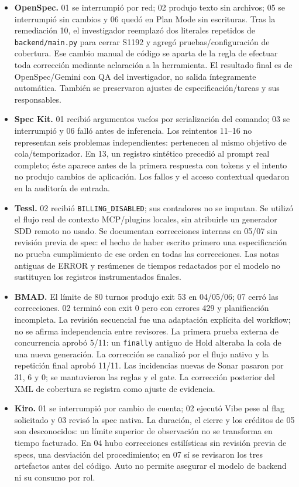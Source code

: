 \begin{itemize}
\item \textbf{OpenSpec.} 01 se interrumpió por red; 02 produjo texto sin archivos; 05 se interrumpió sin cambios y 06 quedó en Plan Mode sin escrituras. Tras la remediación 10, el investigador reemplazó dos literales repetidos de \texttt{backend/main.py} para cerrar S1192 y agregó pruebas/configuración de cobertura. Ese cambio manual de código se aparta de la regla de efectuar toda corrección mediante aclaración a la herramienta. El resultado final es de OpenSpec/Gemini con QA del investigador, no salida íntegramente automática. También se preservaron ajustes de especificación/tareas y sus responsables.
\item \textbf{Spec Kit.} 01 recibió argumentos vacíos por serialización del comando; 03 se interrumpió y 06 falló antes de inferencia. Los reintentos 11--16 no representan seis problemas independientes: pertenecen al mismo objetivo de cola/temporizador. En 13, un registro sintético precedió al prompt real completo; éste aparece antes de la primera respuesta con tokens y el intento no produjo cambios de aplicación. Los fallos y el acceso contextual quedaron en la auditoría de entrada.
\item \textbf{Tessl.} 02 recibió \texttt{BILLING\_DISABLED}; sus contadores no se imputan. Se utilizó el flujo real de contexto MCP/plugins locales, sin atribuirle un generador SDD remoto no usado. Se documentan correcciones internas en 05/07 sin revisión previa de spec: el hecho de haber escrito primero una especificación no prueba cumplimiento de ese orden en todas las correcciones. Las notas antiguas de ERROR y resúmenes de tiempos redactados por el modelo no sustituyen los registros instrumentados finales.
\item \textbf{BMAD.} El límite de 80 turnos produjo exit 53 en 04/05/06; 07 cerró las correcciones. 02 terminó con exit 0 pero con errores 429 y planificación incompleta. La revisión secuencial fue una adaptación explícita del workflow; no se afirma independencia entre revisores. La primera prueba externa de concurrencia aprobó 5/11: un \texttt{finally} antiguo de Hold alteraba la cola de una nueva generación. La corrección se canalizó por el flujo nativo y la repetición final aprobó 11/11. Las incidencias nuevas de Sonar pasaron por 31, 6 y 0; se mantuvieron las reglas y el gate. La corrección posterior del XML de cobertura se registra como ajuste de evidencia.
\item \textbf{Kiro.} 01 se interrumpió por cambio de cuenta; 02 ejecutó Vibe pese al flag solicitado y 03 revisó la spec nativa. La duración, el cierre y los créditos de 05 son desconocidos: un límite superior de observación no se transforma en tiempo facturado. En 04 hubo correcciones estilísticas sin revisión previa de specs, una desviación del procedimiento; en 07 sí se revisaron los tres artefactos antes del código. Auto no permite asegurar el modelo de backend ni su consumo por rol.
\end{itemize}

